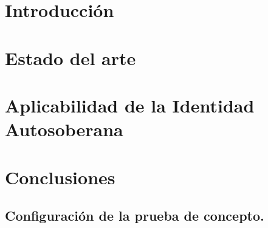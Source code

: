 \documentclass[12pt, a4paper, twoside]{article}
\begin{document}


\clearpage
\setcounter{page}{1}


\newpage


\newpage


\newpage

\tableofcontents

\section{Introducción}\label{Introducción}


\section{Estado del arte}\label{Estado del arte}


\section{Aplicabilidad de la Identidad Autosoberana}\label{Aplicabilidad de la Identidad Autosoberana}


\section{Conclusiones}\label{Conclusiones}


\printbibliography[heading=bibintoc]{}
\newpage

\printglossary[title=Glosario, toctitle=Glosario de términos]
\newpage

\printglossary[type=\acronymtype,title=Acrónimos,toctitle=Listado de acrónimos]
\newpage

\begin{umaappendices}
    \section{Configuración de la prueba de concepto.}\label{Configuración de la prueba de concepto}
    
\end{umaappendices}


\end{document}
